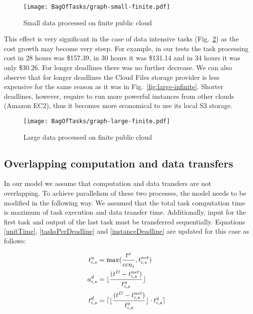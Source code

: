 {  \begin{figure}[tb]
     \centering
     \texttt{[image: BagOfTasks/graph-small-finite.pdf]}
     \caption{Small data processed on finite public
     cloud\label{fig:small-finite}}
  \end{figure}

    
  This effect is very significant in the case of data intensive tasks (Fig.~\ref{fig:large-finite}) as the cost growth may become very steep. For example, in our tests the task processing cost in 28 hours was \$157.39, in 30 hours it was \$131.14 and in 34 hours it was only \$30.26. For longer deadlines there was no further decrease. We can also observe that for longer deadlines the Cloud Files storage provider is less expensive for the same reason as it was in Fig.~\ref{fig:large-infinite}. Shorter deadlines, however, require to run more powerful instances from other clouds (Amazon EC2), thus it becomes more economical to use its local S3 storage.
    
  \begin{figure}[tb]
     \centering
     \texttt{[image: BagOfTasks/graph-large-finite.pdf]}
     \caption{Large data processed on finite public
     cloud\label{fig:large-finite}}
  \end{figure}  
  
\subsection{Overlapping computation and data transfers}
\label{sec:overlapping}
  
  In our model we assume that computation and data transfers are not overlapping. To achieve parallelism of these two processes, the model needs to be modified in the following way. We assumed that the total task computation time is maximum of task execution and data transfer time. Additionally, input for the first task and output of the last task must be transferred sequentially. Equations \ref{unitTime}, \ref{tasksPerDeadline} and \ref{instanceDeadline} are updated for this case as follows:
  
  \begin{align}
      t^u_{i,s} &= \max(\frac{t^x}{ccu_i}, t^{net}_{i,s})  \\    
      a^d_{i,s} &= \lfloor\frac{(t^D - t^{net}_{i,s})}{t^u_{i,s}}\rfloor \\         
      t^d_{i,s} &= \lceil\lfloor\frac{(t^D - t^{net}_{i,s})}{t^u_{i,s}} \rfloor \cdot t^u_{i,s} \rceil            
  \end{align}
  
}
